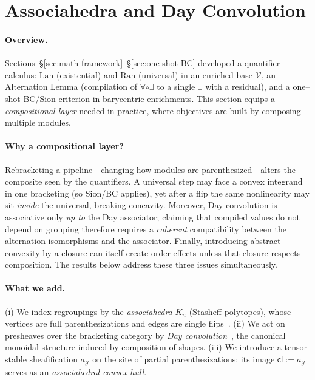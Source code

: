 \documentclass[11pt]{article}
\numberwithin{equation}{section}
\theoremstyle{upright}
\newcommand{\V}{\mathcal{V}}
\newcommand{\Lan}{\mathrm{Lan}}
\newcommand{\Ran}{\mathrm{Ran}}
\begin{document}
\section{Associahedra and Day Convolution}
\label{sec:associahedra-day}

\paragraph{Overview.}
Sections~\S\ref{sec:math-framework}--\S\ref{sec:one-shot-BC} developed a quantifier calculus:
$\Lan$ (existential) and $\Ran$ (universal) in an enriched base $\V$, an Alternation Lemma
(compilation of $\forall\circ\exists$ to a single $\exists$ with a residual), and a one–shot
BC/Sion criterion in barycentric enrichments. This section equips a \emph{compositional layer}
needed in practice, where objectives are built by composing multiple modules.

\paragraph{Why a compositional layer?}
Rebracketing a pipeline—changing how modules are parenthesized—alters the composite seen by the
quantifiers. A universal step may face a convex integrand in one bracketing (so Sion/BC applies),
yet after a flip the same nonlinearity may sit \emph{inside} the universal, breaking concavity.
Moreover, Day convolution is associative only \emph{up to} the Day associator; claiming that compiled
values do not depend on grouping therefore requires a \emph{coherent} compatibility between the
alternation isomorphisms and the associator. Finally, introducing abstract convexity by a closure
can itself create order effects unless that closure respects composition. The results below address
these three issues simultaneously.

\paragraph{What we add.}
(i) We index regroupings by the \emph{associahedra} $K_n$ (Stasheff polytopes), whose vertices are
full parenthesizations and edges are single flips~\citep{Stasheff1963I,Loday2004}.
(ii) We act on presheaves over the bracketing category by \emph{Day convolution}~\citep{Day1970},
the canonical monoidal structure induced by composition of shapes. (iii) We introduce a
tensor-stable sheafification $a_{\mathcal J}$ on the site of partial parenthesizations; its image
$\mathsf{cl}:=a_{\mathcal J}$ serves as an \emph{associahedral convex hull}.
\end{document}
